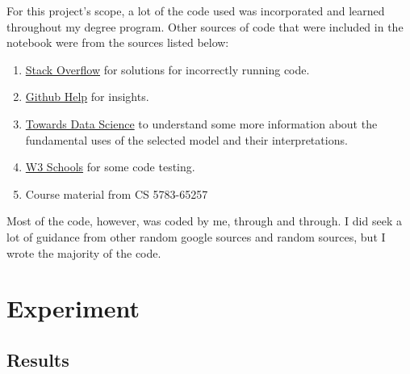 \documentclass[10pt,twocolumn,letterpaper]{article}
\begin{document}
For this project's scope, a lot of the code used was incorporated and learned throughout my degree program. Other sources of code that were included in the notebook were from the sources listed below:
\begin{enumerate}
    \item \href{https://stackoverflow.com/}{Stack Overflow} for solutions for incorrectly running code.
    \item \href{https://github.com/milaan9/93\_Python\_Data\_Analytics\_Projects/blob/main/007\_Breast\_Cancer\_Prediction\_with\_ML}{Github Help} for insights.
    \item \href{https://towardsdatascience.com/}{Towards Data Science} to understand some more information about the fundamental uses of the selected model and their interpretations.
    \item \href{https://www.w3schools.com/}{W3 Schools} for some code testing.
    \item Course material from CS 5783-65257
\end{enumerate}

Most of the code, however, was coded by me, through and through. I did seek a lot of guidance from other random google sources and random sources, but I wrote the majority of the code.

\section{Experiment}
\label{sec:Results and Discussion}
\subsection{Results}
\end{document}
